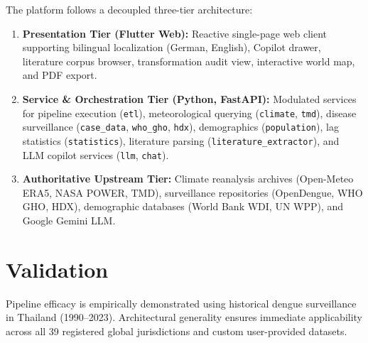 \documentclass[11pt,a4paper]{article}
\begin{document}
The platform follows a decoupled three-tier architecture:
\begin{enumerate}[label=(\arabic*)]\sloppy
  \item \textbf{Presentation Tier (Flutter Web):} Reactive single-page web client supporting bilingual localization (German, English), Copilot drawer, literature corpus browser, transformation audit view, interactive world map, and PDF export.
  \item \textbf{Service \& Orchestration Tier (Python, FastAPI):} Modulated services for pipeline execution (\texttt{etl}), meteorological querying (\texttt{climate}, \texttt{tmd}), disease surveillance (\texttt{case\_data}, \texttt{who\_gho}, \texttt{hdx}), demographics (\texttt{population}), lag statistics (\texttt{statistics}), literature parsing (\texttt{literature\_extractor}), and LLM copilot services (\texttt{llm}, \texttt{chat}).
  \item \textbf{Authoritative Upstream Tier:} Climate reanalysis archives (Open-Meteo ERA5, NASA POWER, TMD), surveillance repositories (OpenDengue, WHO GHO, HDX), demographic databases (World Bank WDI, UN WPP), and Google Gemini LLM.
\end{enumerate}

\section{Validation}

Pipeline efficacy is empirically demonstrated using historical dengue surveillance in
Thailand (1990--2023). Architectural generality ensures immediate applicability
across all 39 registered global jurisdictions and custom user-provided datasets.
\end{document}
